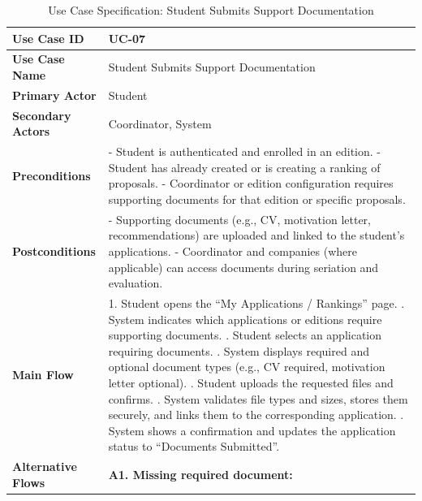 \newpage
\renewcommand{\arraystretch}{1.5} 
\begin{xltabular}{\textwidth}{|l|X|}
    \caption{Use Case Specification: Student Submits Support Documentation} \label{tab:UC-07} \\
    
    \hline
    \textbf{Use Case ID} & UC-07 \\ \hline
    \textbf{Use Case Name} & Student Submits Support Documentation \\ \hline
    \textbf{Primary Actor} & Student \\ \hline
    \textbf{Secondary Actors} & Coordinator, System \\ \hline
    \textbf{Preconditions} &
        - Student is authenticated and enrolled in an edition. \newline
        - Student has already created or is creating a ranking of proposals. \newline
        - Coordinator or edition configuration requires supporting documents for that edition or specific proposals.
        \\ \hline
    \textbf{Postconditions} &
        - Supporting documents (e.g., CV, motivation letter, recommendations) are uploaded and linked to the student’s applications. \newline
        - Coordinator and companies (where applicable) can access documents during seriation and evaluation.
        \\ \hline
    \textbf{Main Flow} &
        1. Student opens the “My Applications / Rankings” page. . System indicates which applications or editions require supporting documents. . Student selects an application requiring documents. . System displays required and optional document types (e.g., CV required, motivation letter optional). . Student uploads the requested files and confirms. . System validates file types and sizes, stores them securely, and links them to the corresponding application. . System shows a confirmation and updates the application status to “Documents Submitted”. \\ \hline
    \textbf{Alternative Flows} &
        \textbf{A1. Missing required document:} \newline

\end{xltabular}

